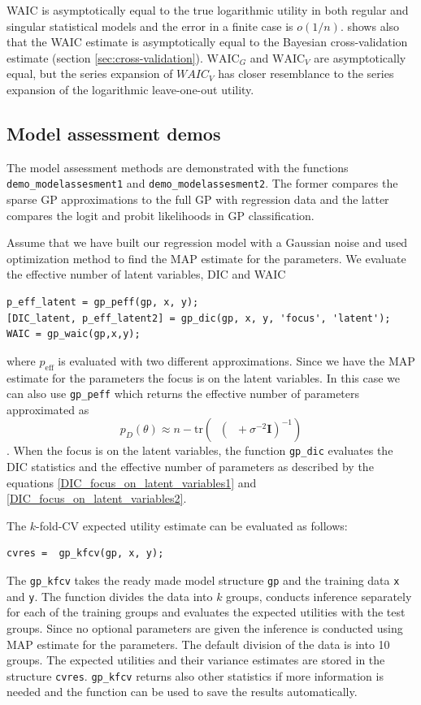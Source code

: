 \documentclass[twoside,11pt]{article}
\DeclareMathOperator{\iKff}{\mathbf{K}_{f,f}^{-1}}
\def\WAIC{\mathrm{WAIC}}
\newcommand{\mb}{\mathbf}
\newcommand{\code}[1]{{\normalfont\texttt{#1}}}
\begin{document}
WAIC is asymptotically equal to the true logarithmic utility in
both regular and singular statistical models and the error in a
finite case is $o(1/n)$. \citet{Watanabe:2010d} shows also that the
WAIC estimate is asymptotically equal to the Bayesian
cross-validation estimate (section \ref{sec:cross-validation}).
%
$\WAIC_{G}$ and $\WAIC_V$ are asymptotically equal, but the series
expansion of $WAIC_V$ has closer resemblance to the series
expansion of the logarithmic leave-one-out utility.

\subsection{Model assessment demos}

The model assessment methods are demonstrated with the functions
\code{demo\_modelassesment1} and \code{demo\_modelassesment2}. The
former compares the sparse GP approximations to the full GP with
regression data and the latter compares the logit and probit
likelihoods in GP classification.

Assume that we have built our regression model with a Gaussian noise
and used optimization method to find the MAP estimate for the
parameters. We evaluate the effective number of latent
variables, DIC and WAIC
%
\begin{verbatim}
p_eff_latent = gp_peff(gp, x, y);
[DIC_latent, p_eff_latent2] = gp_dic(gp, x, y, 'focus', 'latent');
WAIC = gp_waic(gp,x,y);
\end{verbatim}
%
where $p_{\text{eff}}$ is evaluated with two different approximations.
Since we have the MAP estimate for the parameters the focus is on
the latent variables. In this case we can also use \code{gp\_peff}
which returns the effective number of parameters approximated as
%
\begin{equation}\label{eq_peff_fast_approx}
p_{D}(\theta) \approx n - \text{tr}(\iKff (\iKff + \sigma^{-2}\mb{I})^{-1})
\end{equation}
%
\citep{Spiegelhalter+Best+Carlin+Linde:2002}. When the focus is on the
latent variables, the function \code{gp\_dic} evaluates the DIC
statistics and the effective number of parameters as described by the
equations \eqref{DIC_focus_on_latent_variables1} and
\eqref{DIC_focus_on_latent_variables2}. 

The $k$-fold-CV expected utility estimate can be evaluated as follows:
%
\begin{verbatim}
cvres =  gp_kfcv(gp, x, y);
\end{verbatim}
% 
The \code{gp\_kfcv} takes the ready made model structure \code{gp} and
the training data \code{x} and \code{y}. The function divides the data
into $k$ groups, conducts inference separately for each of the
training groups and evaluates the expected utilities with the test
groups. Since no optional parameters are given the inference is
conducted using MAP estimate for the parameters. The default division
of the data is into 10 groups.  The expected utilities and their
variance estimates are stored in the structure \code{cvres}.
\code{gp\_kfcv} returns also other statistics if more information is
needed and the function can be used to save the results automatically.
\end{document}
